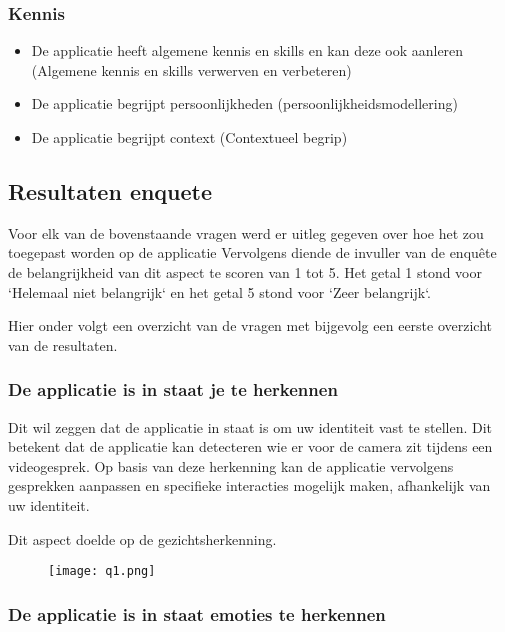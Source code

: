 \subsubsection{Kennis}

\begin{itemize}
    \item De applicatie heeft algemene kennis en skills en kan deze ook aanleren (Algemene kennis en skills verwerven en verbeteren)
    \item De applicatie begrijpt persoonlijkheden (persoonlijkheidsmodellering)
    \item De applicatie begrijpt context (Contextueel begrip)
\end{itemize}

\subsection{Resultaten enquete}

Voor elk van de bovenstaande vragen werd er uitleg gegeven over hoe het zou toegepast worden op de applicatie Vervolgens diende de invuller van de enquête de belangrijkheid van dit aspect te scoren van 1 tot 5. Het getal 1 stond voor `Helemaal niet belangrijk` en het getal 5 stond voor `Zeer belangrijk`.

Hier onder volgt een overzicht van de vragen met bijgevolg een eerste overzicht van de resultaten.

\subsubsection{De applicatie is in staat je te herkennen}

Dit wil zeggen dat de applicatie in staat is om uw identiteit vast te stellen. Dit betekent dat de applicatie kan detecteren wie er voor de camera zit tijdens een videogesprek. Op basis van deze herkenning kan de applicatie vervolgens gesprekken aanpassen en specifieke interacties mogelijk maken, afhankelijk van uw identiteit.

Dit aspect doelde op de gezichtsherkenning.

\begin{figure}[htbp]
    \centering
    \texttt{[image: q1.png]}
    \label{fig:vraag_1_resultaat}
\end{figure}

\subsubsection{De applicatie is in staat emoties te herkennen}

